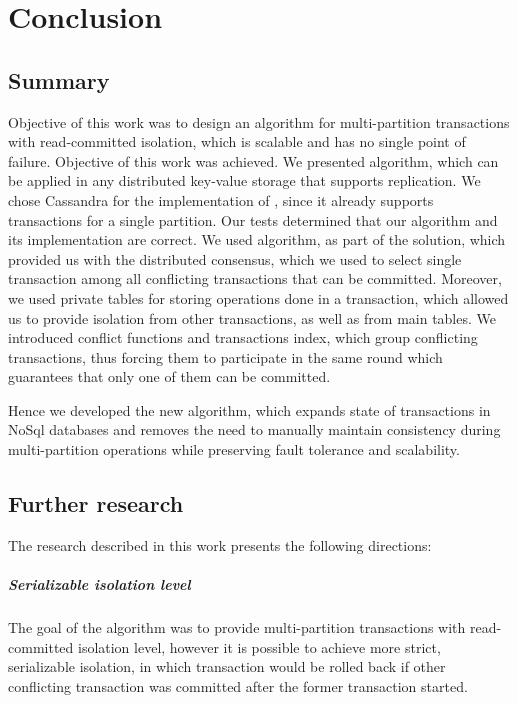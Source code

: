 
\chapter{Conclusion}\label{chapter:summary}

\section{Summary}
Objective of this work was to design an algorithm for multi-partition transactions with read-committed isolation, which is scalable and has no single point of failure. Objective of this work was achieved. We presented \mpt algorithm, which can be applied in any distributed key-value storage that supports replication.
We chose Cassandra for the implementation of \mpt, since it already supports transactions for a single partition. Our tests determined that our algorithm and its implementation are correct. We used \paxos algorithm, as part of the solution, which provided us with the distributed consensus, which we used to select single transaction among all conflicting transactions that can be committed. Moreover, we used private tables for storing operations done in a  transaction, which allowed us to provide isolation from other transactions, as well as from main tables. We introduced conflict functions and transactions index, which group conflicting transactions, thus forcing them to participate in the same \paxos round which guarantees that only one of them can be committed.

Hence we developed the new algorithm, which expands state of transactions in NoSql databases and 
removes the need to manually maintain consistency during multi-partition operations 
while preserving fault tolerance and scalability. 


\section{Further research}
The research described in this work presents the following directions:

\paragraph{Serializable isolation level}
The goal of the algorithm was to provide multi-partition transactions with read-committed isolation level, however it is possible to achieve more strict, serializable isolation, in which transaction would be rolled back if other conflicting transaction was committed after the former transaction started. 

